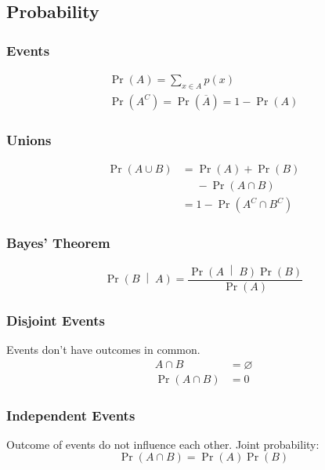 \documentclass{article}
\begin{document}
\begin{multicols}{3}
    \subsection*{Probability}
    \subsubsection*{Events}
    \begin{gather*}
        \Pr{\left( A \right)} = \sum_{x\in A} p(x) \\
        \Pr{\left( A^C \right)} = \Pr{\left( \overline{A} \right)} = 1 - \Pr{\left( A \right)}
    \end{gather*}
    \subsubsection*{Unions}
    \begin{align*}
        \Pr{\left( A \cup B \right)} & = \Pr{\left( A \right)} + \Pr{\left( B \right)} \\
                                     & \phantom{=} - \Pr{\left( A \cap B \right)}      \\
                                     & = 1 - \Pr{\left( A^C \cap B^C \right)}
    \end{align*}
    \subsubsection*{Bayes' Theorem}
    \begin{equation*}
        \Pr{\left(B \;\middle|\; A\right)} = \frac{\Pr{\left( A \;\middle|\; B \right)}\Pr{\left( B \right)}}{\Pr{\left( A \right)}}
    \end{equation*}
    \subsubsection*{Disjoint Events}
    Events don't have outcomes in common.
    \begin{align*}
        A \cap B                   & = \varnothing \\
        \Pr{\left(A \cap B\right)} & = 0
    \end{align*}
    \subsubsection*{Independent Events}
    Outcome of events do not influence each other. Joint probability:
    \begin{equation*}
        \Pr{\left(A \cap B\right)} = \Pr{\left( A \right)}\Pr{\left( B \right)}
    \end{equation*}

\end{multicols}
\end{document}
